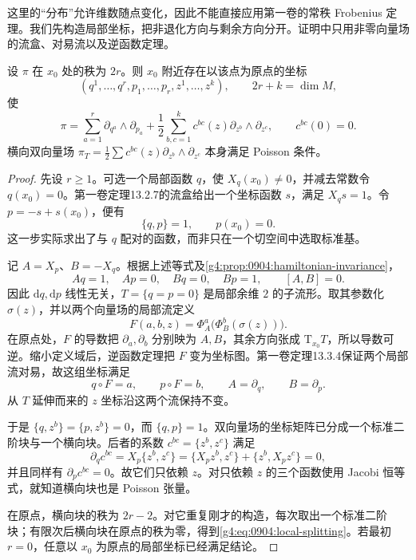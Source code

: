 这里的“分布”允许维数随点变化，因此不能直接应用第一卷的常秩 Frobenius 定理。我们先构造局部坐标，把非退化方向与剩余方向分开。证明中只用非零向量场的流盒、对易流以及逆函数定理。

\begin{theorem}\label{g4:thm:0904:local-splitting}
	设 \(\pi\) 在 \(x_0\) 处的秩为 \(2r\)。则 \(x_0\) 附近存在以该点为原点的坐标
	\[
		(q^1,\ldots,q^r,p_1,\ldots,p_r,z^1,\ldots,z^k),
		\qquad 2r+k=\dim M,
	\]
	使
	\begin{equation}\label{g4:eq:0904:local-splitting}
		\pi=\sum_{a=1}^r\partial_{q^a}\wedge\partial_{p_a}
		+\frac12\sum_{b,c=1}^k c^{bc}(z)\partial_{z^b}\wedge\partial_{z^c},
		\qquad c^{bc}(0)=0.
	\end{equation}
	横向双向量场 \(\pi_T=\frac12\sum c^{bc}(z)\partial_{z^b}\wedge\partial_{z^c}\) 本身满足 Poisson 条件。
\end{theorem}

\begin{proof}
	先设 \(r\geq1\)。可选一个局部函数 \(q\)，使 \(X_q(x_0)\neq0\)，并减去常数令 \(q(x_0)=0\)。第一卷定理13.2.7的流盒给出一个坐标函数 \(s\)，满足 \(X_qs=1\)。令 \(p=-s+s(x_0)\)，便有
	\[
		\{q,p\}=1,
		\qquad p(x_0)=0.
	\]
	这一步实际求出了与 \(q\) 配对的函数，而非只在一个切空间中选取标准基。

	记 \(A=X_p\)、\(B=-X_q\)。根据上述等式及\cref{g4:prop:0904:hamiltonian-invariance}，
	\[
		Aq=1,\quad Ap=0,\quad Bq=0,\quad Bp=1,
		\qquad [A,B]=0.
	\]
	因此 \(\mathrm{d}q,\mathrm{d}p\) 线性无关，\(T=\{q=p=0\}\) 是局部余维 \(2\) 的子流形。取其参数化 \(\sigma(z)\)，并以两个向量场的局部流定义
	\[
		F(a,b,z)=\Phi_A^a\bigl(\Phi_B^b(\sigma(z))\bigr).
	\]
	在原点处，\(F\) 的导数把 \(\partial_a,\partial_b\) 分别映为 \(A,B\)，其余方向张成 \(\mathrm{T}_{x_0}T\)，所以导数可逆。缩小定义域后，逆函数定理把 \(F\) 变为坐标图。第一卷定理13.3.4保证两个局部流对易，故这组坐标满足
	\[
		q\circ F=a,\qquad p\circ F=b,
		\qquad A=\partial_q,\qquad B=\partial_p.
	\]
	从 \(T\) 延伸而来的 \(z\) 坐标沿这两个流保持不变。

	于是 \(\{q,z^b\}=\{p,z^b\}=0\)，而 \(\{q,p\}=1\)。双向量场的坐标矩阵已分成一个标准二阶块与一个横向块。后者的系数 \(c^{bc}=\{z^b,z^c\}\) 满足
	\[
		\partial_q c^{bc}
		=X_p\{z^b,z^c\}
		=\{X_pz^b,z^c\}+\{z^b,X_pz^c\}=0,
	\]
	并且同样有 \(\partial_pc^{bc}=0\)。故它们只依赖 \(z\)。对只依赖 \(z\) 的三个函数使用 Jacobi 恒等式，就知道横向块也是 Poisson 张量。

	在原点，横向块的秩为 \(2r-2\)。对它重复刚才的构造，每次取出一个标准二阶块；有限次后横向块在原点的秩为零，得到\eqref{g4:eq:0904:local-splitting}。若最初 \(r=0\)，任意以 \(x_0\) 为原点的局部坐标已经满足结论。
\end{proof}

